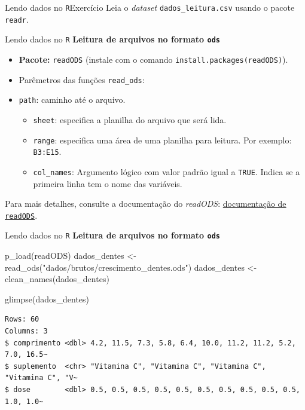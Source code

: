 \documentclass[
  10pt,
  ignorenonframetext,
]{beamer}
\newenvironment{Shaded}{\begin{snugshade}}{\end{snugshade}}
\newcommand{\FunctionTok}[1]{\textcolor[rgb]{0.28,0.35,0.67}{#1}}
\newcommand{\NormalTok}[1]{\textcolor[rgb]{0.00,0.23,0.31}{#1}}
\newcommand{\OtherTok}[1]{\textcolor[rgb]{0.00,0.23,0.31}{#1}}
\newcommand{\StringTok}[1]{\textcolor[rgb]{0.13,0.47,0.30}{#1}}
\providecommand{\tightlist}{%
  \setlength{\itemsep}{0pt}\setlength{\parskip}{0pt}}\usepackage{longtable,booktabs,array}
\begin{document}
\begin{frame}[fragile]{Lendo dados no \texttt{R}\newline Exercício}
\protect\hypertarget{lendo-dados-no-rexercuxedcio-1}{}
Leia o \emph{dataset} \texttt{dados\_leitura.csv} usando o pacote
\texttt{readr}.
\end{frame}

\begin{frame}[fragile]{Lendo dados no \texttt{R}}
\protect\hypertarget{lendo-dados-no-r-4}{}
\textbf{Leitura de arquivos no formato \texttt{ods}}

\begin{itemize}
\tightlist
\item
  \textbf{Pacote:} \texttt{readODS} (instale com o comando
  \texttt{install.packages(\textquotesingle{}readODS\textquotesingle{})}).
\item
  Parêmetros das funções \texttt{read\_ods}:
\item
  \texttt{path}: caminho até o arquivo.

  \begin{itemize}
  \tightlist
  \item
    \texttt{sheet}: especifica a planilha do arquivo que será lida.
  \item
    \texttt{range}: especifica uma área de uma planilha para leitura.
    Por exemplo: \texttt{B3:E15}.
  \item
    \texttt{col\_names}: Argumento lógico com valor padrão igual a
    \texttt{TRUE}. Indica se a primeira linha tem o nome das variáveis.
  \end{itemize}
\end{itemize}

Para mais detalhes, consulte a documentação do \emph{readODS}:
\href{https://github.com/chainsawriot/readODS}{documentação de
\texttt{readODS}}.
\end{frame}

\begin{frame}[fragile]{Lendo dados no \texttt{R}}
\protect\hypertarget{lendo-dados-no-r-5}{}
\textbf{Leitura de arquivos no formato \texttt{ods}}

\begin{Shaded}
\begin{Highlighting}[]
\FunctionTok{p\_load}\NormalTok{(readODS)}
\NormalTok{dados\_dentes }\OtherTok{\textless{}{-}} \FunctionTok{read\_ods}\NormalTok{(}\StringTok{"dados/brutos/crescimento\_dentes.ods"}\NormalTok{)}
\NormalTok{dados\_dentes }\OtherTok{\textless{}{-}} \FunctionTok{clean\_names}\NormalTok{(dados\_dentes)}

\FunctionTok{glimpse}\NormalTok{(dados\_dentes)}
\end{Highlighting}
\end{Shaded}

\begin{verbatim}
Rows: 60
Columns: 3
$ comprimento <dbl> 4.2, 11.5, 7.3, 5.8, 6.4, 10.0, 11.2, 11.2, 5.2, 7.0, 16.5~
$ suplemento  <chr> "Vitamina C", "Vitamina C", "Vitamina C", "Vitamina C", "V~
$ dose        <dbl> 0.5, 0.5, 0.5, 0.5, 0.5, 0.5, 0.5, 0.5, 0.5, 0.5, 1.0, 1.0~
\end{verbatim}
\end{frame}
\end{document}
